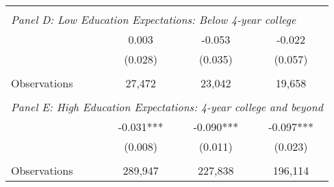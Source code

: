 {\begin{tabular}{lccc}
&  &  &   \\
\multicolumn{4}{l}{\textit{Panel D: Low Education Expectations: Below 4-year college}} \\
\hspace{3mm}        &       0.003   &      -0.053   &      -0.022   \\
                    &     (0.028)   &     (0.035)   &     (0.057)   \\
                    &               &               &               \\
\hspace{3mm}Observations&      27,472   &      23,042   &      19,658   \\
 
&  &  &   \\
\multicolumn{4}{l}{\textit{Panel E: High Education Expectations: 4-year college and beyond}} \\
\hspace{3mm}        &      -0.031***&      -0.090***&      -0.097***\\
                    &     (0.008)   &     (0.011)   &     (0.023)   \\
                    &               &               &               \\
\hspace{3mm}Observations&     289,947   &     227,838   &     196,114   \\
 

\bottomrule
\end{tabular}
}
